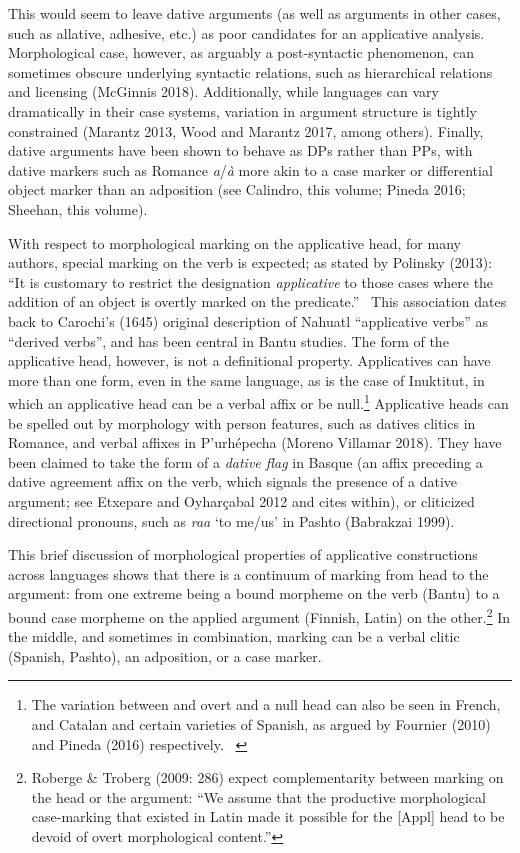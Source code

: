 \documentclass[12pt]{article}
\newenvironment{styleStandard}{\setlength\leftskip{0cm}\setlength\rightskip{0cm plus 1fil}\setlength\parindent{0cm}\setlength\parfillskip{0pt plus 1fil}\setlength\parskip{0in plus 1pt}\writerlistparindent\writerlistleftskip\leavevmode\normalfont\normalsize\writerlistlabel\ignorespaces}{\unskip\vspace{0.111in plus 0.0111in}\par}
\newcommand\writerlistleftskip{}
\newcommand\writerlistparindent{}
\newcommand\writerlistlabel{}
\begin{document}
\begin{styleStandard}
This would seem to leave dative arguments (as well as arguments in other cases, such as allative, adhesive, etc.) as poor candidates for an applicative analysis. Morphological case, however, as arguably a post-syntactic phenomenon, can sometimes obscure underlying syntactic relations, such as hierarchical relations and licensing (McGinnis 2018). Additionally, while languages can vary dramatically in their case systems, variation in argument structure is tightly constrained (Marantz 2013, Wood and Marantz 2017, among others). Finally, dative arguments have been shown to behave as DPs rather than PPs, with dative markers such as Romance \textit{a}/\textit{à} more akin to a case marker or differential object marker than an adposition (see Calindro, this volume; Pineda 2016; Sheehan, this volume). 
\end{styleStandard}

\begin{styleStandard}
With respect to morphological marking on the applicative head, for many authors, special marking on the verb is expected; as stated by Polinsky (2013): “It is customary to restrict the designation \textit{applicative} to those cases where the addition of an object is overtly marked on the predicate.” \ This association dates back to Carochi’s (1645) original description of Nahuatl “applicative verbs” as “derived verbs”, and has been central in Bantu studies. The form of the applicative head, however, is not a definitional property. Applicatives can have more than one form, even in the same language, as is the case of Inuktitut, in which an applicative head can be a verbal affix or be null.\footnote{ The variation between and overt and a null head can also be seen in French, and Catalan and certain varieties of Spanish, as argued by Fournier (2010) and Pineda (2016) respectively. \ } Applicative heads can be spelled out by morphology with person features, such as datives clitics in Romance, and verbal affixes in P’urhépecha (Moreno Villamar 2018). They have been claimed to take the form of a \textit{dative flag} in Basque (an affix preceding a dative agreement affix on the verb, which signals the presence of a dative argument; see Etxepare and Oyharçabal 2012 and cites within), or cliticized directional pronouns, such as \textit{raa} ‘to me/us’ in Pashto (Babrakzai 1999).
\end{styleStandard}

\begin{styleStandard}
This brief discussion of morphological properties of applicative constructions across languages shows that there is a continuum of marking from head to the argument: from one extreme being a bound morpheme on the verb (Bantu) to a bound case morpheme on the applied argument (Finnish, Latin) on the other.\footnote{ Roberge \& Troberg (2009: 286) expect complementarity between marking on the head or the argument: “We assume that the productive morphological case-marking that existed in Latin made it possible for the [Appl] head to be devoid of overt morphological content.” } In the middle, and sometimes in combination, marking can be a verbal clitic (Spanish, Pashto), an adposition, or a case marker. 
\end{styleStandard}
\end{document}
